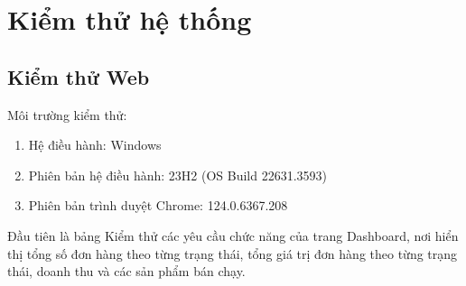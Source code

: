\section{Kiểm thử hệ thống}
\subsection{Kiểm thử Web}
Môi trường kiểm thử:
\begin{enumerate}[-]
    \item Hệ điều hành: Windows
    \item Phiên bản hệ điều hành: 23H2 (OS Build 22631.3593)
    \item Phiên bản trình duyệt Chrome: 124.0.6367.208
\end{enumerate}
Đầu tiên là bảng Kiểm thử các yêu cầu chức năng của trang Dashboard, nơi hiển thị tổng số đơn hàng theo từng trạng thái, tổng giá trị đơn hàng theo từng trạng thái, doanh thu và các sản phẩm bán chạy.
